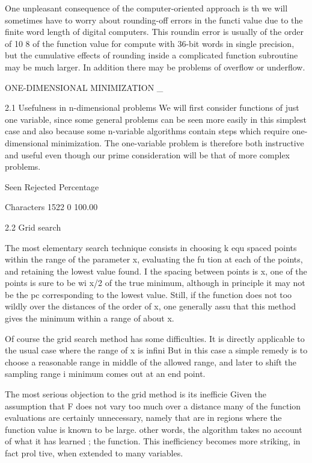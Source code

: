      One unpleasant consequence of the computer-oriented approach is th
we will sometimes have to worry about rounding-off errors in the functi
value due to the finite word length of digital computers.  This roundin
error is usually of the order of 10 8 of the function value for compute
with 36-bit words in single precision, but the cumulative effects of
rounding inside a complicated function subroutine may be much larger.
In addition there may be problems of overflow or underflow.
 
 
 
ONE-DIMENSIONAL MINIMIZATION
_
 
2.1  Usefulness in n-dimensional problems
     We will first consider functions of just one variable, since some
general problems can be seen more easily in this simplest case and also
because some n-variable algorithms contain steps which require one-
dimensional minimization.  The one-variable problem is therefore both
instructive and useful even though our prime consideration will be that
of more complex problems.
 
                 Seen Rejected  Percentage
 
Characters       1522        0  100.00
 
 
2.2  Grid search
 
     The most elementary search technique consists in choosing k equ
spaced points within the range of the parameter x, evaluating the fu
tion at each of the points, and retaining the lowest value found.  I
the spacing between points is x, one of the points is sure to be wi
x/2 of the true minimum, although in principle it may not be the pc
corresponding to the lowest value.  Still, if the function does not
too wildly over the distances of the order of x, one generally assu
that this method gives the minimum within a range of about x.
 
     Of course the grid search method has some difficulties.  It is
directly applicable to the usual case where the range of x is infini
But in this case a simple remedy is to choose a reasonable range in
middle of the allowed range, and later to shift the sampling range i
minimum comes out at an end point.
 
     The most serious objection to the grid method is its inefficie
Given the assumption that F does not vary too much over a distance
many of the function evaluations are certainly unnecessary, namely
that are in regions where the function value is known to be large.
other words, the algorithm takes no account of what it has learned ;
the function.  This inefficiency becomes more striking, in fact prol
tive, when extended to many variables.
 
